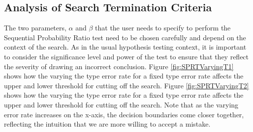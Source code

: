 \subsection{Analysis of Search Termination Criteria}
The two parameters, $\alpha$ and $\beta$ that the user needs to specify to perform the Sequential Probability Ratio test need to be chosen carefully and depend on the context of the search. As in the usual hypothesis testing context, it is important to consider the significance level and power of the test to ensure that they reflect the severity of drawing an incorrect conclusion. Figure \ref{fig:SPRTVaryingT1} shows how the varying the type  error rate for a fixed type  error rate affects the upper and lower threshold for cutting off the search. Figure \ref{fig:SPRTVaryingT2} shows how the varying the type  error rate for a fixed type  error rate affects the upper and lower threshold for cutting off the search. Note that as the varying error rate increases on the x-axis, the decision boundaries come closer together, reflecting the intuition that we are more willing to accept a mistake.




